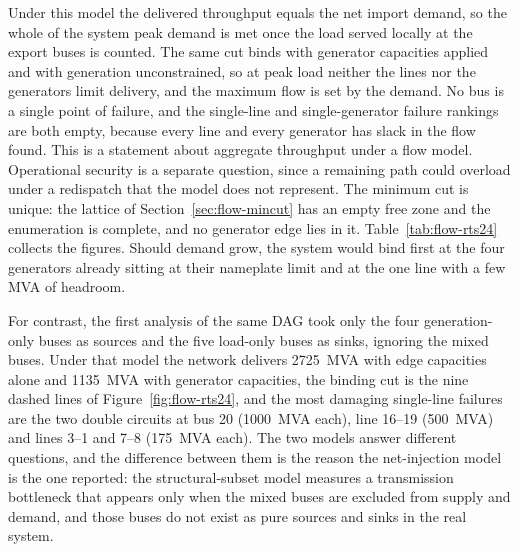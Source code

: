 \documentclass[12pt]{report}
\begin{document}
Under this model the delivered throughput equals the net import demand, so the whole of the
system peak demand is met once the load served locally at the export buses is counted. The
same cut binds with generator capacities applied and with generation unconstrained, so at
peak load neither the lines nor the generators limit delivery, and the maximum flow is set
by the demand. No bus is a single point of failure, and the single-line and
single-generator failure rankings are both empty, because every line and every generator has
slack in the flow found. This is a statement about aggregate throughput under a flow model.
Operational security is a separate question, since a remaining path could overload under a
redispatch that the model does not represent. The minimum cut is unique: the lattice of
Section~\ref{sec:flow-mincut} has an empty free zone and the enumeration is complete, and no
generator edge lies in it. Table~\ref{tab:flow-rts24} collects the figures. Should demand
grow, the system would bind first at the four generators already sitting at their nameplate
limit and at the one line with a few MVA of headroom.

For contrast, the first analysis of the same DAG took only the four generation-only buses as
sources and the five load-only buses as sinks, ignoring the mixed buses. Under that model the
network delivers 2725~MVA with edge capacities alone and 1135~MVA with generator capacities,
the binding cut is the nine dashed lines of Figure~\ref{fig:flow-rts24}, and the most damaging
single-line failures are the two double circuits at bus 20 (1000~MVA each), line 16--19
(500~MVA) and lines 3--1 and 7--8 (175~MVA each). The two models answer different questions,
and the difference between them is the reason the net-injection model is the one reported:
the structural-subset model measures a transmission bottleneck that appears only when the
mixed buses are excluded from supply and demand, and those buses do not exist as pure
sources and sinks in the real system.
\end{document}
